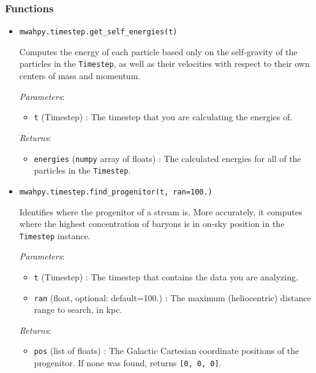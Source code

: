 \documentclass{article}
\begin{document}
\subsubsection{Functions}

\begin{itemize}



\item \verb!mwahpy.timestep.get_self_energies(t)!

Computes the energy of each particle based only on the self-gravity of the particles in the \verb!Timestep!, as well as their velocities with respect to their own centers of mass and momentum.  

\textit{Parameters}: \begin{itemize}

\item \verb!t! (Timestep) : The timestep that you are calculating the energies of. 

\end{itemize}

\textit{Returns}: \begin{itemize}

\item \verb!energies! (\verb!numpy! array of floats) : The calculated energies for all of the particles in the \verb!Timestep!.

\end{itemize}



\item \verb!mwahpy.timestep.find_progenitor(t, ran=100.)!

Identifies where the progenitor of a stream is. More accurately, it computes where the highest concentration of baryons is in on-sky position in the \verb!Timestep! instance. 

\textit{Parameters}: \begin{itemize}

\item \verb!t! (Timestep) : The timestep that contains the data you are analyzing. 

\item \verb!ran! (float, optional: default=100.) : The maximum (heliocentric) distance range to search, in kpc.

\end{itemize}

\textit{Returns}: \begin{itemize}

\item \verb!pos! (list of floats) : The Galactic Cartesian coordinate positions of the progenitor. If none was found, returns \verb![0, 0, 0]!. 

\end{itemize}



\end{itemize}
\end{document}

